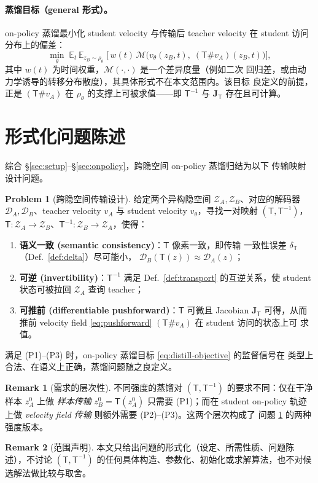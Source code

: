 \documentclass[11pt,a4paper]{article}
\newcommand{\E}{\mathbb{E}}
\newcommand{\Za}{\mathcal{Z}_{A}}
\newcommand{\Zb}{\mathcal{Z}_{B}}
\newcommand{\Dec}{\mathcal{D}}
\newcommand{\Tmap}{\mathsf{T}}
\newcommand{\Tinv}{\mathsf{T}^{-1}}
\newcommand{\push}{\#}
\newcommand{\Jac}{\mathbf{J}}
\theoremstyle{definition}
\newtheorem{problem}{Problem}
\newtheorem{remark}{Remark}
\begin{document}
\paragraph{蒸馏目标（general 形式）。}
on-policy 蒸馏最小化 student velocity 与传输后 teacher velocity 在 student
访问分布上的偏差：
\begin{equation}
\min_{\theta}\;
\E_{t}\,\E_{z_B\sim\rho_\theta}\;
\Big[\,w(t)\,
\mathcal{M}\!\Big(v_\theta(z_B,t),\;(\Tmap\push v_A)(z_B,t)\Big)\Big],
\label{eq:distill-objective}
\end{equation}
其中 $w(t)$ 为时间权重，$\mathcal{M}(\cdot,\cdot)$ 是一个差异度量（例如二次
回归差，或由动力学诱导的转移分布散度），其具体形式不在本文范围内。该目标
良定义的前提，正是 $(\Tmap\push v_A)$ 在 $\rho_\theta$ 的支撑上可被求值——即
$\Tinv$ 与 $\Jac_{\Tmap}$ 存在且可计算。

\section{形式化问题陈述}
\label{sec:problem-statement}

综合 \S\ref{sec:setup}--\S\ref{sec:onpolicy}，跨隐空间 on-policy 蒸馏归结为以下
传输映射设计问题。

\begin{problem}[跨隐空间传输设计]
\label{prob:main}
给定两个异构隐空间 $\Za,\Zb$、对应的解码器 $\Dec_A,\Dec_B$、teacher velocity
$v_A$ 与 student velocity $v_\theta$，寻找一对映射 $(\Tmap,\Tinv)$，
$\Tmap:\Za\to\Zb$、$\Tinv:\Zb\to\Za$，使得：
\begin{enumerate}[leftmargin=2.4em,label=\textup{(P\arabic*)},itemsep=3pt]
  \item \textbf{语义一致 (semantic consistency)}：$\Tmap$ 像素一致，即传输
        一致性误差 $\delta_{\Tmap}$（Def.~\ref{def:delta}）尽可能小，
        $\Dec_B(\Tmap(z))\approx\Dec_A(z)$；
  \item \textbf{可逆 (invertibility)}：$\Tinv$ 满足 Def.~\ref{def:transport}
        的互逆关系，使 student 状态可被拉回 $\Za$ 查询 teacher；
  \item \textbf{可推前 (differentiable pushforward)}：$\Tmap$ 可微且 Jacobian
        $\Jac_{\Tmap}$ 可得，从而推前 velocity field
        \eqref{eq:pushforward} $(\Tmap\push v_A)$ 在 student 访问的状态上可
        求值。
\end{enumerate}
满足 (P1)--(P3) 时，on-policy 蒸馏目标 \eqref{eq:distill-objective} 的监督信号在
类型上合法、在语义上正确，蒸馏问题随之良定义。
\end{problem}

\begin{remark}[需求的层次性]
\label{rem:layering}
不同强度的蒸馏对 $(\Tmap,\Tinv)$ 的要求不同：仅在干净样本 $z_A^{0}$ 上做
\emph{样本传输} $z_B^{0}=\Tmap(z_A^{0})$ 只需要 (P1)；而在 student on-policy
轨迹上做 \emph{velocity field 传输} 则额外需要 (P2)--(P3)。这两个层次构成了
问题 \ref{prob:main} 的两种强度版本。
\end{remark}

\begin{remark}[范围声明]
本文只给出问题的形式化（设定、所需性质、问题陈述），不讨论 $(\Tmap,\Tinv)$
的任何具体构造、参数化、初始化或求解算法，也不对候选解法做比较与取舍。
\end{remark}
\end{document}
